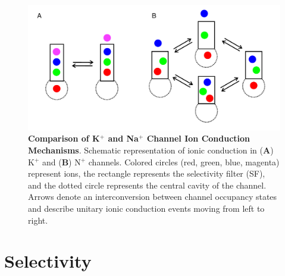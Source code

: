 \begin{refsection}
\begin{figure}[hp]
\includegraphics[width=1.0\textwidth]{outlook/outlookFig2}
\caption[Comparison of K$^+$ and Na$^+$ Channel Ion Conduction Mechanisms]{\textbf{Comparison of K$^+$ and Na$^+$ Channel Ion Conduction Mechanisms}. Schematic representation of ionic conduction in (\textbf{A}) K$^+$ and (\textbf{B}) N$^+$ channels. Colored circles (red, green, blue, magenta) represent ions, the rectangle represents the selectivity filter (SF), and the dotted circle represents the central cavity of the channel. Arrows denote an interconversion between channel occupancy states and describe unitary ionic conduction events moving from left to right.}
\label{fig:outlookFig2}
\centering
\end{figure}

\section{Selectivity}



\end{refsection}
